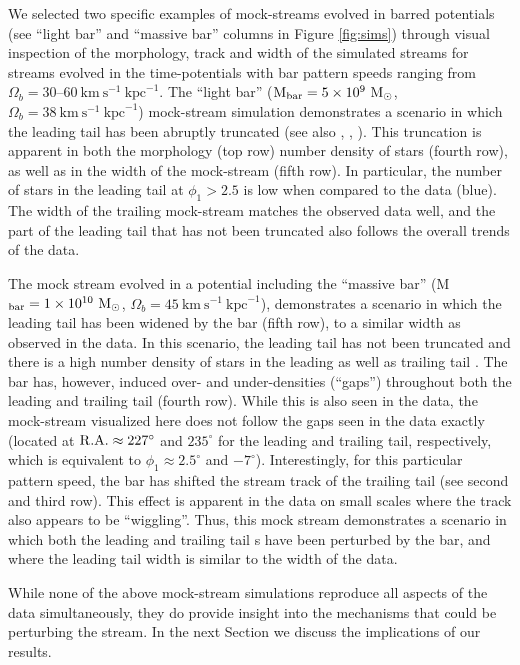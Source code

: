 \documentclass[twocolumn]{aastex62}
\newcommand{\msun}{\textrm{M}_\odot}
\newcommand{\kmskpc}{\ensuremath{\textrm{km}~\textrm{s}^{-1}~\textrm{kpc}^{-1}}}
\begin{document}
We selected two specific examples of mock-streams evolved in barred potentials (see ``light bar'' and ``massive bar'' columns in Figure \ref{fig:sims}) through visual inspection of the morphology, track and width of the simulated streams for streams evolved in the time-potentials with bar pattern speeds ranging from $\Omega_b = 30$--$60~\kmskpc$. The ``light bar''  ($\textrm{M}_{\rm bar} = 5\times 10^{9}~\msun$, $\Omega_b = 38 ~\kmskpc$) mock-stream simulation demonstrates a scenario in which the leading tail has been abruptly truncated (see also \citealt{Price-Whelan:2016b}, \citealt{Pearson:2017}, \citealt{Erkal:2017}). This truncation is apparent in both the morphology (top row) number density of stars (fourth row), as well as in the width of the mock-stream (fifth row). In particular, the number of stars in the leading tail at $\phi_1 > 2.5$ is low when compared to the data (blue).
The width of the trailing mock-stream matches the observed data well, and the part of the leading tail that has not been truncated also follows the overall trends of the data.

The mock stream evolved in a potential including the  ``massive bar'' (M$_{\rm bar} = 1\times 10^{10}~\msun$, $\Omega_b = 45~\kmskpc$), demonstrates a scenario in which the leading tail has been widened by the bar (fifth row), to a similar width as observed in the data. In this scenario, the leading tail has not been truncated and there is a high number density of stars in the leading as well as trailing tail . The bar has, however, induced over- and under-densities (``gaps'') throughout both the leading and trailing tail  (fourth row). While this is also seen in the data, the mock-stream visualized here does not follow the gaps seen in the data exactly (located at $\rm R.A.\approx 227^\circ$ and $235^\circ$ for the leading and trailing tail, respectively, which is equivalent to $\phi_1 \approx 2.5^\circ$ and $-7^\circ$). Interestingly, for this particular pattern speed, the bar has shifted the stream track of the trailing tail  (see second and third row). This effect is apparent in the data on small scales where the track also appears to be ``wiggling''. Thus, this mock stream demonstrates a scenario in which both the leading and trailing tail s have been perturbed by the bar, and where the leading tail width is similar to the width of the data.

While none of the above mock-stream simulations reproduce all aspects of the data simultaneously, they do provide insight into the mechanisms that could be perturbing the stream. In the next Section we discuss the implications of our results.
\end{document}
